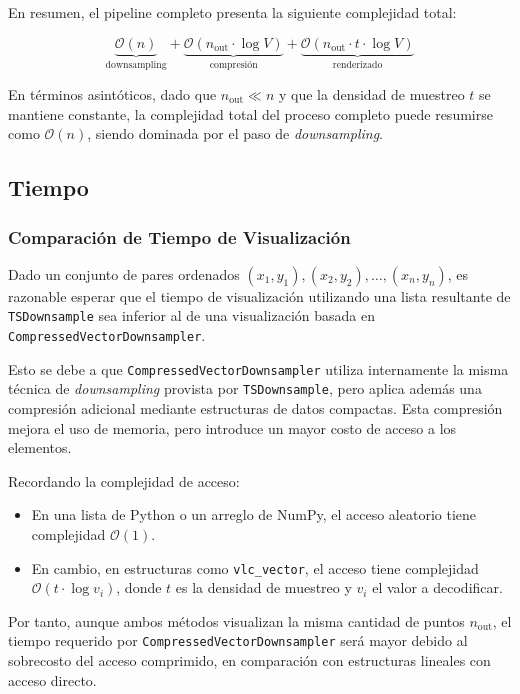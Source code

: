 \noindent En resumen, el pipeline completo presenta la siguiente complejidad total:

\[
\underbrace{\mathcal{O}(n)}_{\text{downsampling}} +
\underbrace{\mathcal{O}(n_{\text{out}} \cdot \log V)}_{\text{compresión}} +
\underbrace{\mathcal{O}(n_{\text{out}} \cdot t \cdot \log V)}_{\text{renderizado}}
\]

En términos asintóticos, dado que \(n_{\text{out}} \ll n\) y que la densidad de muestreo \(t\) se mantiene constante, la complejidad total del proceso completo puede resumirse como \(\mathcal{O}(n)\), siendo dominada por el paso de \textit{downsampling}.

\subsection{Tiempo}

\subsubsection{Comparación de Tiempo de Visualización}

Dado un conjunto de pares ordenados \((x_1, y_1), (x_2, y_2), \ldots, (x_n, y_n)\), es razonable esperar que el tiempo de visualización utilizando una lista resultante de \texttt{TSDownsample} sea inferior al de una visualización basada en \texttt{CompressedVectorDownsampler}.

Esto se debe a que \texttt{CompressedVectorDownsampler} utiliza internamente la misma técnica de \textit{downsampling} provista por \texttt{TSDownsample}, pero aplica además una compresión adicional mediante estructuras de datos compactas. Esta compresión mejora el uso de memoria, pero introduce un mayor costo de acceso a los elementos.

Recordando la complejidad de acceso:
\begin{itemize}
    \item En una lista de Python o un arreglo de NumPy, el acceso aleatorio tiene complejidad \(\mathcal{O}(1)\).
    \item En cambio, en estructuras como \texttt{vlc\_vector}, el acceso tiene complejidad \(\mathcal{O}(t \cdot \log v_i)\), donde \(t\) es la densidad de muestreo y \(v_i\) el valor a decodificar.
\end{itemize}

Por tanto, aunque ambos métodos visualizan la misma cantidad de puntos \(n_{\text{out}}\), el tiempo requerido por \texttt{CompressedVectorDownsampler} será mayor debido al sobrecosto del acceso comprimido, en comparación con estructuras lineales con acceso directo.

